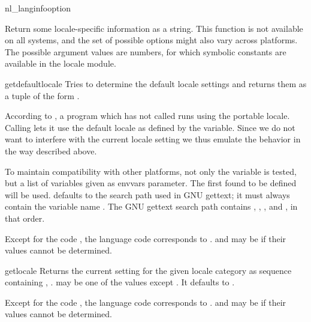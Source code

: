 \begin{funcdesc}{nl_langinfo}{option}

Return some locale-specific information as a string. This function is
not available on all systems, and the set of possible options might
also vary across platforms. The possible argument values are numbers,
for which symbolic constants are available in the locale module.

\end{funcdesc}

\begin{funcdesc}{getdefaultlocale}{}
  Tries to determine the default locale settings and returns
  them as a tuple of the form .

  According to \POSIX, a program which has not called
   runs using the portable 
  locale.  Calling  lets it use the
  default locale as defined by the  variable.  Since we
  do not want to interfere with the current locale setting we thus
  emulate the behavior in the way described above.

  To maintain compatibility with other platforms, not only the
   variable is tested, but a list of variables given as
  envvars parameter.  The first found to be defined will be
  used.   defaults to the search path used in GNU gettext;
  it must always contain the variable name .  The GNU
  gettext search path contains , ,
  , and , in that order.

  Except for the code , the language code corresponds to
  .   and  may be
   if their values cannot be determined.
\end{funcdesc}

\begin{funcdesc}{getlocale}{}
  Returns the current setting for the given locale category as
  sequence containing , .
   may be one of the  values except
  .  It defaults to .

  Except for the code , the language code corresponds to
  .   and  may be
   if their values cannot be determined.
\end{funcdesc}

